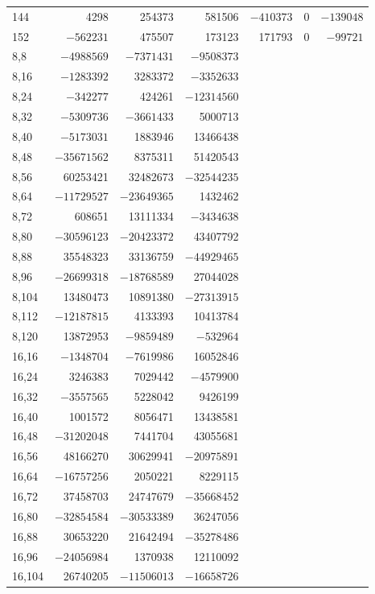 \documentclass[11pt,colorlinks]{charlie}
\begin{document}
{\begin{longtable}{@{}l rrrrrr@{}}
144 & 4298 & 254373 & 581506 & $-410373$ & 0 & $-139048$\\
152 & $-562231$ & 475507 & 173123 & 171793 & 0 & $-99721$\\
8,8 & $-4988569$ & $-7371431$ & $-9508373$ &  &  & \\
8,16 & $-1283392$ & 3283372 & $-3352633$ &  &  & \\
8,24 & $-342277$ & 424261 & $-12314560$ &  &  & \\
8,32 & $-5309736$ & $-3661433$ & 5000713 &  &  & \\
8,40 & $-5173031$ & 1883946 & 13466438 &  &  & \\
8,48 & $-35671562$ & 8375311 & 51420543 &  &  & \\
8,56 & 60253421 & 32482673 & $-32544235$ &  &  & \\
8,64 & $-11729527$ & $-23649365$ & 1432462 &  &  & \\
8,72 & 608651 & 13111334 & $-3434638$ &  &  & \\
8,80 & $-30596123$ & $-20423372$ & 43407792 &  &  & \\
8,88 & 35548323 & 33136759 & $-44929465$ &  &  & \\
8,96 & $-26699318$ & $-18768589$ & 27044028 &  &  & \\
8,104 & 13480473 & 10891380 & $-27313915$ &  &  & \\
8,112 & $-12187815$ & 4133393 & 10413784 &  &  & \\
8,120 & 13872953 & $-9859489$ & $-532964$ &  &  & \\
16,16 & $-1348704$ & $-7619986$ & 16052846 &  &  & \\
16,24 & 3246383 & 7029442 & $-4579900$ &  &  & \\
16,32 & $-3557565$ & 5228042 & 9426199 &  &  & \\
16,40 & 1001572 & 8056471 & 13438581 &  &  & \\
16,48 & $-31202048$ & 7441704 & 43055681 &  &  & \\
16,56 & 48166270 & 30629941 & $-20975891$ &  &  & \\
16,64 & $-16757256$ & 2050221 & 8229115 &  &  & \\
16,72 & 37458703 & 24747679 & $-35668452$ &  &  & \\
16,80 & $-32854584$ & $-30533389$ & 36247056 &  &  & \\
16,88 & 30653220 & 21642494 & $-35278486$ &  &  & \\
16,96 & $-24056984$ & 1370938 & 12110092 &  &  & \\
16,104 & 26740205 & $-11506013$ & $-16658726$ &  &  & \\

\end{longtable}}
\end{document}
